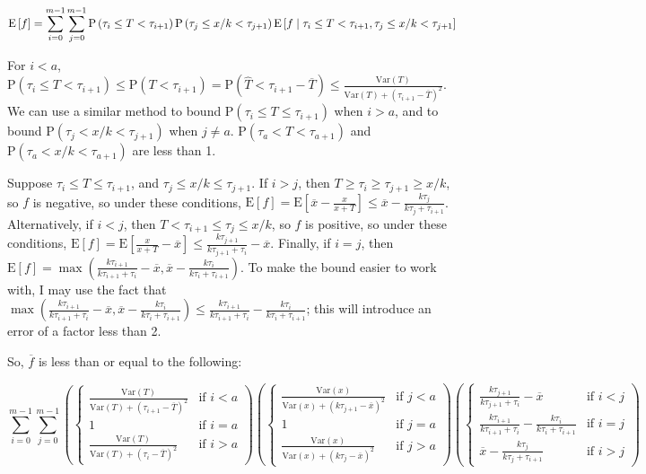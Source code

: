 \documentclass{article}
\newcommand \E[1] {\mathrm E \left[#1\right]} %
\newcommand \Var[1] {\mathrm {Var} \left(#1\right)} %
\newcommand \p[1] {\mathrm P \left(#1\right)}
\begin{document}
\begin{equation*}
\E f = \sum_{i=0}^{m-1} \sum_{j=0}^{m-1} \p{\tau_i\leq T<\tau_{i+1}} \p{\tau_j \leq x/k < \tau_{j+1}} \E{f \mid \tau_i\leq T<\tau_{i+1}, \tau_j \leq x/k <\tau_{j+1}} \\
\end{equation*}

For $i<a$, $\p{\tau_i\leq T<\tau_{i+1}} \leq \p{T<\tau_{i+1}} = \p{\hat T < \tau_{i+1}-\overline T} \leq \frac{\Var T}{\Var T + (\tau_{i+1}-\overline T)^2}$. We can use a similar method to bound $\p{\tau_i\leq T\leq \tau_{i+1}}$ when $i>a$, and to bound $\p{\tau_j<x/k<\tau_{j+1}}$ when $j\neq a$. $\p{\tau_a<T<\tau_{a+1}}$ and $\p{\tau_a<x/k<\tau_{a+1}}$ are less than 1.

Suppose $\tau_i\leq T\leq \tau_{i+1}$, and $\tau_j\leq x/k\leq \tau_{j+1}$. If $i>j$, then $T\geq\tau_i\geq\tau_{j+1}\geq x/k$, so $f$ is negative, so under these conditions, $\E f = \E{\overline x - \frac{x}{x+T}} \leq \overline x - \frac{k\tau_j}{k\tau_j + \tau_{i+1}}$. Alternatively, if $i<j$, then $T<\tau_{i+1}\leq\tau_j\leq x/k$, so $f$ is positive, so under these conditions, $\E f = \E{\frac{x}{x+T}-\overline x} \leq \frac{k\tau_{j+1}}{k\tau_{j+1}+\tau_i} - \overline x$. Finally, if $i=j$, then $\E f = \max\left(\frac{k\tau_{i+1}}{k\tau_{i+1}+\tau_i}-\overline x, \overline x - \frac{k\tau_i}{k\tau_i+\tau_{i+1}}\right)$. To make the bound easier to work with, I may use the fact that $\max\left(\frac{k\tau_{i+1}}{k\tau_{i+1}+\tau_i}-\overline x, \overline x - \frac{k\tau_i}{k\tau_i+\tau_{i+1}}\right) \leq \frac{k\tau_{i+1}}{k\tau_{i+1}+\tau_i} - \frac{k\tau_i}{k\tau_i+\tau_{i+1}}$; this will introduce an error of a factor less than 2.

So, $\overline f$ is less than or equal to the following:

\begin{equation*}
\sum_{i=0}^{m-1}\sum_{j=0}^{m-1}
\left(\begin{cases}
	\frac{\Var T}{\Var T + (\tau_{i+1}-\overline T)^2} & \text{if $i<a$}\\
	1 & \text{if $i=a$} \\
	\frac{\Var T}{\Var T + (\tau_i-\overline T)^2} & \text{if $i>a$}
\end{cases}\right)
\left(\begin{cases}
	\frac{\Var x}{\Var x + (k\tau_{j+1}-\overline x)^2} & \text{if $j<a$}\\
	1 & \text{if $j=a$}\\
	\frac{\Var x}{\Var x + (k\tau_j-\overline x)^2} & \text{if $j>a$}
\end{cases}\right)
\left(\begin{cases}
	\frac{k\tau_{j+1}}{k\tau_{j+1}+\tau_i} - \overline x & \text{if $i<j$}\\
	\frac{k\tau_{i+1}}{k\tau_{i+1}+\tau_i} - \frac{k\tau_i}{k\tau_i+\tau_{i+1}} & \text{if $i=j$}\\
	\overline x - \frac{k\tau_j}{k\tau_j + \tau_{i+1}} & \text{if $i>j$}
\end{cases}\right)
\end{equation*}
\end{document}
